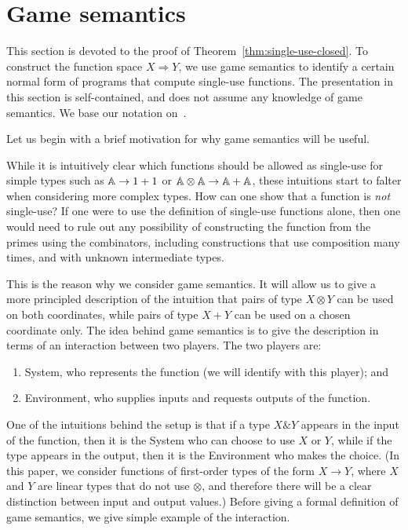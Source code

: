 \newcommand{\invar}[1]{#1_{\mathrm{in}}}
\newcommand{\outvar}[1]{#1_{\mathrm{out}}}

\section{Game semantics}
\label{sec:game-semantics}

This section is devoted to the proof of Theorem~\ref{thm:single-use-closed}. To construct the function space $X \Rightarrow Y$, we use game semantics to identify a certain normal form of programs that compute single-use functions. The presentation in this section is self-contained, and does not assume any knowledge of game semantics. We base our notation on~\cite{abramsky2013semantics}.

Let us begin with a brief motivation for why game semantics will be useful.

While it is intuitively clear which functions should be allowed as single-use for simple types such as $\mathbb A \to 1+1$ or $\mathbb A \otimes \mathbb A \to \mathbb A + \mathbb A$, these intuitions start to falter when considering more complex types. How can one show that a function is \emph{not} single-use? If one were to use the definition of single-use functions alone, then one would need to rule out any possibility of constructing the function from the primes using the combinators, including constructions that use composition many times, and with unknown intermediate types. 

This is the reason why we consider game semantics. It will allow us to give  a more principled description of the intuition that pairs of type $X \otimes Y$ can be used on both coordinates, while pairs of type $X + Y$ can be used on a chosen coordinate only. The idea behind game semantics is to give the description in terms of an interaction between two players.  The two players are:
\begin{enumerate}
    \item System, who represents the function (we will identify with this player); and
    \item Environment, who supplies inputs and requests outputs of the function.
\end{enumerate}
One of the intuitions behind the setup is that if a type $X \& Y$ appears in the input of the function, then it is the System who can choose to use $X$ or $Y$, while if the type appears in the output, then it is the Environment who makes the choice. (In this paper, we consider functions of first-order types of the form $X \to Y$, where $X$ and $Y$ are linear types that do not use $\otimes$, and therefore there will be a clear distinction between input and output values.)
Before giving a formal definition of game semantics, we give simple example of the interaction.

